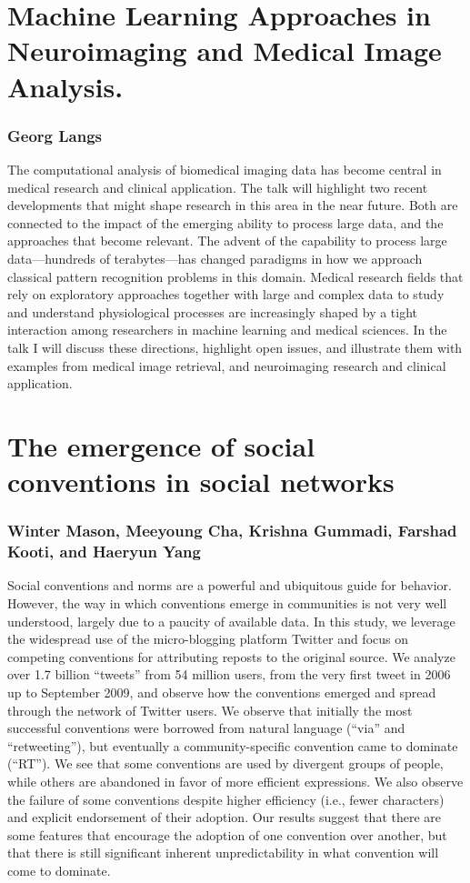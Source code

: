 \documentclass[10pt,letterpaper]{article}
\begin{document}
\section{Machine Learning Approaches in Neuroimaging and Medical Image Analysis.}
\subsubsection{Georg Langs}

The computational analysis of biomedical imaging data has become central in
medical research and clinical application. The talk will highlight two recent
developments that might shape research in this area in the near future. Both are
connected to the impact of the emerging ability to process large data, and the
approaches that become relevant. The advent of the capability to process large
data---hundreds of terabytes---has changed paradigms in how we approach classical
pattern recognition problems in this domain. Medical research fields that rely on
exploratory approaches together with large and complex data to study and
understand physiological processes are increasingly shaped by a tight interaction
among researchers in machine learning and medical sciences. In the talk I will
discuss these directions, highlight open issues, and illustrate them
with examples from medical image retrieval, and neuroimaging research and
clinical application.

\section{The emergence of social conventions in social networks}
\subsubsection{Winter Mason, Meeyoung Cha, Krishna Gummadi, Farshad Kooti, and Haeryun Yang}

Social conventions and norms are a powerful and ubiquitous guide for behavior.
However, the way in which conventions emerge in communities is not very well
understood, largely due to a paucity of available data.  In this study, we
leverage the widespread use of the micro-blogging platform Twitter and focus on
competing conventions for attributing reposts to the original source.  We analyze
over 1.7 billion ``tweets'' from 54 million users, from the very first tweet in
2006 up to September 2009, and observe how the conventions emerged and spread
through the network of Twitter users.  We observe that initially the most
successful conventions were borrowed from natural language (``via'' and
``retweeting''), but eventually a community-specific convention came to dominate
(``RT'').  We see that some conventions are used by divergent groups of people,
while others are abandoned in favor of more efficient expressions.  We also
observe the failure of some conventions despite higher efficiency (i.e., fewer
characters) and explicit endorsement of their adoption.  Our results suggest that
there are some features that encourage the adoption of one convention over
another, but that there is still significant inherent unpredictability in what
convention will come to dominate.
\end{document}
